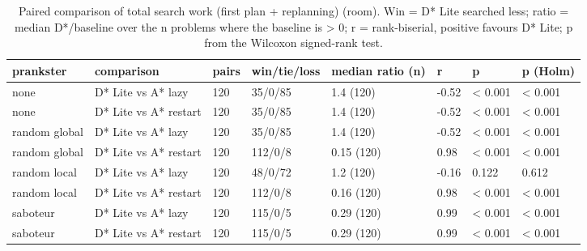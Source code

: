 \begin{table}[t]
\centering
\small
\caption{Paired comparison of total search work (first plan + replanning) (room). Win = D* Lite searched less; ratio = median D*/baseline over the n problems where the baseline is > 0; r = rank-biserial, positive favours D* Lite; p from the Wilcoxon signed-rank test.}
\label{tab:tests-total-room}
\begin{tabular}{llllllll}
\toprule
prankster & comparison & pairs & win/tie/loss & median ratio (n) & r & p & p (Holm) \\
\midrule
none & D* Lite vs A* lazy & 120 & 35/0/85 & 1.4 (120) & -0.52 & < 0.001 & < 0.001 \\
none & D* Lite vs A* restart & 120 & 35/0/85 & 1.4 (120) & -0.52 & < 0.001 & < 0.001 \\
random global & D* Lite vs A* lazy & 120 & 35/0/85 & 1.4 (120) & -0.52 & < 0.001 & < 0.001 \\
random global & D* Lite vs A* restart & 120 & 112/0/8 & 0.15 (120) & 0.98 & < 0.001 & < 0.001 \\
random local & D* Lite vs A* lazy & 120 & 48/0/72 & 1.2 (120) & -0.16 & 0.122 & 0.612 \\
random local & D* Lite vs A* restart & 120 & 112/0/8 & 0.16 (120) & 0.98 & < 0.001 & < 0.001 \\
saboteur & D* Lite vs A* lazy & 120 & 115/0/5 & 0.29 (120) & 0.99 & < 0.001 & < 0.001 \\
saboteur & D* Lite vs A* restart & 120 & 115/0/5 & 0.29 (120) & 0.99 & < 0.001 & < 0.001 \\
\bottomrule
\end{tabular}
\end{table}
